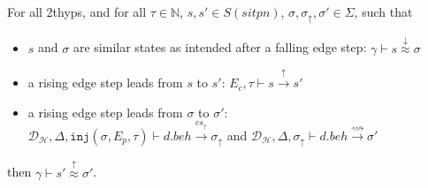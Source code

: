 \documentclass[dvipsnames,12pt]{article}
\begin{document}
\begin{lemma}
  \label{lem:re-lock-step}
  For all \hm2thyps{}, and for all $\tau\in\mathbb{N}$,
  $s,s'\in{}S(sitpn)$, $\sigma,\sigma_\uparrow,\sigma'\in\Sigma$, such
  that
  \begin{itemize}
  \item $s$ and $\sigma$ are similar states as intended after a
    falling edge step:
    $\gamma\vdash{}s\stackrel{\downarrow}{\approx}\sigma$
  \item a rising edge step leads from $s$ to $s'$:
    $E_c,\tau\vdash{}s\xrightarrow{\uparrow}s'$
  \item a rising edge step leads from $\sigma$ to $\sigma'$:\\
    $\mathcal{D}_\mathcal{H},\Delta,\mathtt{inj}(\sigma,E_p,\tau)\vdash{}d.beh\xrightarrow{cs_{\uparrow}}\sigma_{\uparrow}$
    and
    $\mathcal{D}_\mathcal{H},\Delta,\sigma_{\uparrow}\vdash{}d.beh\xrightarrow{\rightsquigarrow}\sigma'$
  \end{itemize}
  then $\gamma\vdash{}s'\stackrel{\uparrow}{\approx}{}\sigma'$.
  
\end{lemma}
\end{document}
